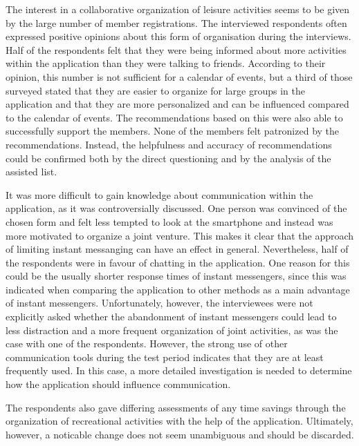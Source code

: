\documentclass[12pt,numbers=noenddot,parskip,bibliography=totocnumbered,listof=totocnumbered,draft]{scrreprt}
\begin{document}
The interest in a collaborative organization of leisure activities seems to be given by the large number of member registrations. The interviewed respondents often expressed positive opinions about this form of organisation during the interviews. Half of the respondents felt that they were being informed about more activities within the application than they were talking to friends. According to their opinion, this number is not sufficient for a calendar of events, but a third of those surveyed stated that they are easier to organize for large groups in the application and that they are more personalized and can be influenced compared to the calendar of events. The recommendations based on this were also able to successfully support the members. None of the members felt patronized by the recommendations. Instead, the helpfulness and accuracy of recommendations could be confirmed both by the direct questioning and by the analysis of the assisted list.

It was more difficult to gain knowledge about communication within the application, as it was controversially discussed. One person was convinced of the chosen form and felt less tempted to look at the smartphone and instead was more motivated to organize a joint venture. This makes it clear that the approach of limiting instant messanging can have an effect in general. Nevertheless, half of the respondents were in favour of chatting in the application. One reason for this could be the usually shorter response times of instant messengers, since this was indicated when comparing the application to other methods as a main advantage of instant messengers. Unfortunately, however, the interviewees were not explicitly asked whether the abandonment of instant messengers could lead to less distraction and a more frequent organization of joint activities, as was the case with one of the respondents. However, the strong use of other communication tools during the test period indicates that they are at least frequently used. In this case, a more detailed investigation is needed to determine how the application should influence communication.

The respondents also gave differing assessments of any time savings through the organization of recreational activities with the help of the application. Ultimately, however, a noticable change does not seem unambiguous and should be discarded. 
\end{document}
